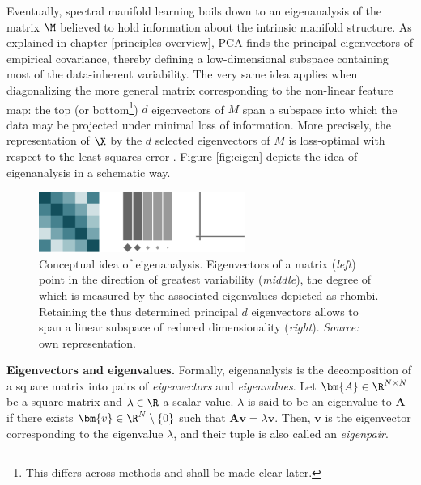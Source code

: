 Eventually, spectral manifold learning boils down to an eigenanalysis 
of the matrix $\M$ believed to hold information about the intrinsic 
manifold structure.
As explained in chapter \ref{principles-overview}, PCA finds the principal 
eigenvectors of empirical covariance, thereby defining a low-dimensional 
subspace containing most of the data-inherent variability.
The very same idea applies when diagonalizing the more general matrix 
corresponding to the non-linear feature map: the top (or bottom\footnote{
This differs across methods and shall be made clear later.
}) $d$ eigenvectors of $M$ span a subspace into which the data may be projected 
under minimal loss of information.
More precisely, the representation of $\X$ by the $d$ selected eigenvectors of 
$M$ is loss-optimal with respect to the least-squares error
\citep{schoelkopfetal1998}.
Figure \ref{fig:eigen} depicts the idea of eigenanalysis in a schematic way.

\begin{figure}[H]
    \centering
    \includegraphics[trim = 0 0 0 0, clip, %
      width = 0.6\textwidth]{figures/eigenanalysis}
    \caption[Schematic view on eigenanalysis]{Conceptual idea of eigenanalysis. 
    Eigenvectors of a matrix (\textit{left}) point in the direction of greatest 
    variability (\textit{middle}), the degree of which is measured by the 
    associated eigenvalues depicted as rhombi. Retaining the thus determined 
    principal $d$ eigenvectors allows to span a linear subspace of reduced 
    dimensionality (\textit{right}).
    \textit{Source:} own representation.}
    \label{fig-eigen}
  \end{figure}

\textbf{Eigenvectors and eigenvalues.} Formally, eigenanalysis is the 
decomposition of a square matrix into pairs of \textit{eigenvectors} and 
\textit{eigenvalues}.
Let $\bm{A} \in \R^{N \times N}$ be a square matrix and $\lambda \in \R$ a 
scalar value. 
$\lambda$ is said to be an eigenvalue to $\bm{A}$ if there exists 
$\bm{v} \in \R^N \setminus \{0\}$ such that $\bm{A} \bm{v} = \lambda \bm{v}$.
Then, $\bm{v}$ is the eigenvector corresponding to the eigenvalue $\lambda$, and 
their tuple is also called an \textit{eigenpair}.
\\


